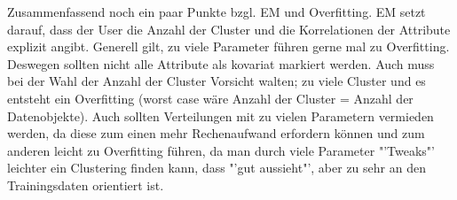  Zusammenfassend noch ein paar Punkte bzgl. EM und Overfitting. EM setzt darauf,
 dass der User die Anzahl der Cluster und die Korrelationen der Attribute
 explizit angibt. Generell gilt, zu viele Parameter führen gerne mal zu Overfitting.
 Deswegen sollten nicht alle Attribute als kovariat markiert werden. Auch muss
 bei der Wahl der Anzahl der Cluster Vorsicht walten; zu viele Cluster und es
 entsteht ein Overfitting (worst case wäre Anzahl der Cluster = Anzahl der
 Datenobjekte). Auch sollten Verteilungen mit zu vielen Parametern vermieden werden,
 da diese zum einen mehr Rechenaufwand erfordern können und zum anderen
 leicht zu Overfitting führen, da man durch viele Parameter "'Tweaks"' leichter
 ein Clustering finden kann, dass "'gut aussieht"', aber zu sehr an den Trainingsdaten
 orientiert ist.